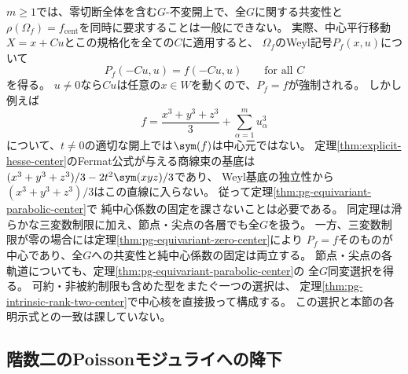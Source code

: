 \begin{remark}[純中心係数の固定と平行移動]
\label{rem:pg-equivariant-pure-center-obstruction}
$m\geq1$では、零切断全体を含む$G$-不変開上で、全$G$に関する共変性と
$\rho(\Omega_f)=f_{\mathrm{cent}}$を同時に要求することは一般にできない。
実際、中心平行移動$X=x+Cu$とこの規格化を全ての$C$に適用すると、
$\Omega_f$のWeyl記号$P_f(x,u)$について
\begin{equation}
 P_f(-Cu,u)=f(-Cu,u)\qquad\text{for all }C
 \label{eq:pg-equivariant-pure-center-evaluation}
\end{equation}
を得る。
$u\ne0$なら$Cu$は任意の$x\in W$を動くので、$P_f=f$が強制される。
しかし例えば
\begin{equation}
 f=\frac{x^3+y^3+z^3}{3}+\sum_{\alpha=1}^m u_\alpha^3
 \label{eq:pg-equivariant-pure-center-fermat}
\end{equation}
について、$t\ne0$の適切な開上では$\sym(f)$は中心元ではない。
定理\ref{thm:explicit-hesse-center}のFermat公式が与える商線束の基底は
$(x^3+y^3+z^3)/3-2t^2\sym(xyz)/3$であり、
Weyl基底の独立性から$(x^3+y^3+z^3)/3$はこの直線に入らない。
従って定理\ref{thm:pg-equivariant-parabolic-center}で
純中心係数の固定を課さないことは必要である。
同定理は滑らかな三変数制限に加え、節点・尖点の各層でも全$G$を扱う。
一方、三変数制限が零の場合には定理\ref{thm:pg-equivariant-zero-center}により
$P_f=f$そのものが中心であり、全$G$への共変性と純中心係数の固定は両立する。
節点・尖点の各軌道についても、定理\ref{thm:pg-equivariant-parabolic-center}の
全$G$同変選択を得る。
可約・非被約制限も含めた型をまたぐ一つの選択は、
定理\ref{thm:pg-intrinsic-rank-two-center}で中心核を直接扱って構成する。
この選択と本節の各明示式との一致は課していない。
\end{remark}

\subsection{階数二のPoissonモジュライへの降下}

